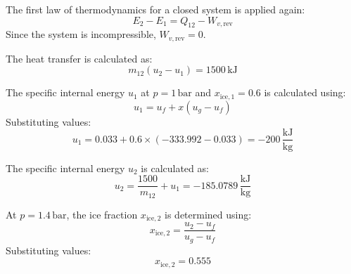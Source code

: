 The first law of thermodynamics for a closed system is applied again:  
\[
E_2 - E_1 = Q_{12} - W_{v,\text{rev}}
\]  
Since the system is incompressible, \( W_{v,\text{rev}} = 0 \).  

The heat transfer is calculated as:  
\[
m_{12} (u_2 - u_1) = 1500 \, \text{kJ}
\]  

The specific internal energy \( u_1 \) at \( p = 1 \, \text{bar} \) and \( x_{\text{ice},1} = 0.6 \) is calculated using:  
\[
u_1 = u_f + x (u_g - u_f)
\]  
Substituting values:  
\[
u_1 = 0.033 + 0.6 \times (-333.992 - 0.033) = -200 \, \frac{\text{kJ}}{\text{kg}}
\]  

The specific internal energy \( u_2 \) is calculated as:  
\[
u_2 = \frac{1500}{m_{12}} + u_1 = -185.0789 \, \frac{\text{kJ}}{\text{kg}}
\]  

At \( p = 1.4 \, \text{bar} \), the ice fraction \( x_{\text{ice},2} \) is determined using:  
\[
x_{\text{ice},2} = \frac{u_2 - u_f}{u_g - u_f}
\]  
Substituting values:  
\[
x_{\text{ice},2} = 0.555
\]